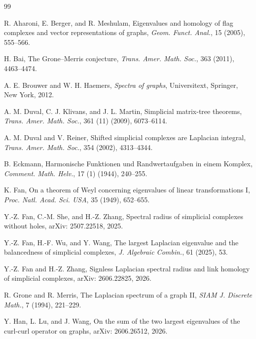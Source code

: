 \documentclass[12pt]{amsart}
\theoremstyle{plain}
\theoremstyle{definition}
\numberwithin{equation}{section}
\numberwithin{figure}{section}
\begin{document}
\begin{thebibliography}{99}

R. Aharoni, E. Berger, and R. Meshulam,
\newblock Eigenvalues and homology of flag complexes and vector representations of graphs,
\newblock \emph{Geom. Funct. Anal.}, 15 (2005), 555--566.

H. Bai,
\newblock The Grone--Merris conjecture,
\newblock \emph{Trans. Amer. Math. Soc.}, 363 (2011), 4463--4474.

A. E. Brouwer and W. H. Haemers,
\newblock \emph{Spectra of graphs},
\newblock Universitext, Springer, New York, 2012.

A. M. Duval, C. J. Klivans, and J. L. Martin,
\newblock Simplicial matrix-tree theorems,
\newblock \emph{Trans. Amer. Math. Soc.}, 361 (11) (2009), 6073--6114.

A. M. Duval and V. Reiner,
\newblock Shifted simplicial complexes are Laplacian integral,
\newblock \emph{Trans. Amer. Math. Soc.}, 354 (2002), 4313--4344.

B. Eckmann,
\newblock Harmonische Funktionen und Randwertaufgaben in einem Komplex,
\newblock \emph{Comment. Math. Helv.}, 17 (1) (1944), 240--255.

K. Fan,
\newblock On a theorem of Weyl concerning eigenvalues of linear transformations I,
\newblock \emph{Proc. Natl. Acad. Sci. USA}, 35 (1949), 652--655.

Y.-Z. Fan, C.-M. She, and H.-Z. Zhang,
\newblock Spectral radius of simplicial complexes without holes,
\newblock arXiv: 2507.22518, 2025.

Y.-Z. Fan, H.-F. Wu, and Y. Wang,
\newblock The largest Laplacian eigenvalue and the balancedness of simplicial complexes,
\newblock \emph{J. Algebraic Combin.}, 61 (2025), 53.

Y.-Z. Fan and H.-Z. Zhang,
\newblock Signless Laplacian spectral radius and link homology of simplicial complexes,
\newblock arXiv: 2606.22825, 2026.

R. Grone and R. Merris,
\newblock The Laplacian spectrum of a graph II,
\newblock \emph{SIAM J. Discrete Math.}, 7 (1994), 221--229.

Y. Han, L. Lu, and J. Wang,
\newblock On the sum of the two largest eigenvalues of the curl-curl operator on graphs,
\newblock arXiv: 2606.26512, 2026.


\end{thebibliography}
\end{document}
